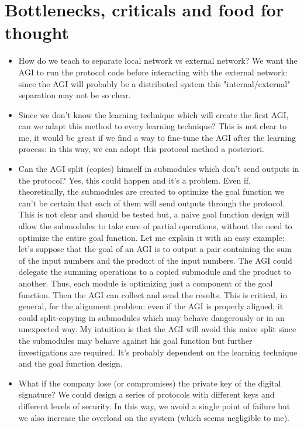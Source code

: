 \documentclass{article}
\begin{document}
\section{Bottlenecks, criticals and food for thought}

\begin{itemize}
    \item How do we teach to separate local network vs external network? 
    We want the AGI to run the protocol code before interacting with the external network: since the AGI will probably be a distributed system this "internal/external" separation may not be so clear.
    \item Since we don't know the learning technique which will create the first AGI, can we adapt this method to every learning technique? 
    This is not clear to me, it would be great if we find a way to fine-tune the AGI after the learning process: in this way, we can adopt this protocol method a posteriori. 

    \item Can the AGI split (copies) himself in submodules which don't send outputs in the protocol? Yes, this could happen and it's a problem. Even if, theoretically, the submodules are created to optimize the goal function we can't be certain that each of them will send outputs through the protocol. 
    This is not clear and should be tested but, a naive goal function design will allow the submodules to take care of partial operations, without the need to optimize the entire goal function. 
    Let me explain it with an easy example: let's suppose that the goal of an AGI is to output a pair containing the sum of the input numbers and the product of the input numbers. The AGI could delegate the summing operations to a copied submodule and the product to another. Thus, each module is optimizing just a component of the goal function. Then the AGI can collect and send the results.
    This is critical, in general, for the alignment problem: even if the AGI is properly aligned, it could split-copying in submodules which may behave dangerously or in an unexpected way.
    My intuition is that the AGI will avoid this naive split since the submodules may behave against his goal function but further investigations are required. 
    It's probably dependent on the learning technique and the goal function design.

    \item What if the company lose (or compromises) the private key of the digital signature? We could design a series of protocols with different keys and different levels of security. 
    In this way, we avoid a single point of failure but we also increase the overload on the system (which seems negligible to me).
    

\end{itemize}
\end{document}

